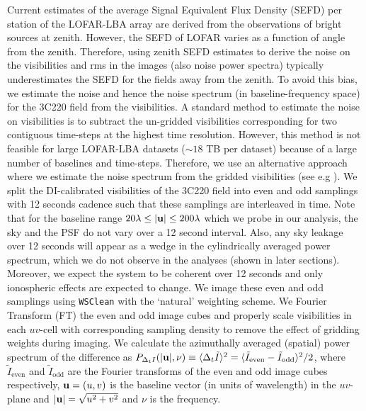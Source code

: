 \documentclass[fleqn,usenatbib]{mnras}
\begin{document}
Current estimates of the average Signal Equivalent Flux Density (SEFD) per station of the LOFAR-LBA array are derived from the observations of bright sources at zenith. However, the SEFD of LOFAR varies as a function of angle from the zenith. Therefore, using zenith SEFD estimates to derive the noise on the visibilities and rms in the images (also noise power spectra) typically underestimates the SEFD for the fields away from the zenith. To avoid this bias, we estimate the noise and hence the noise spectrum (in baseline-frequency space) for the 3C220 field from the visibilities. A standard method to estimate the noise on visibilities is to subtract the un-gridded visibilities corresponding for two contiguous time-steps at the highest time resolution. However, this method is not feasible for large LOFAR-LBA datasets ($\sim18$ TB per dataset) because of a large number of baselines and time-steps. Therefore, we use an alternative approach where we estimate the noise spectrum from the gridded visibilities (see e.g \citealt{jacobs2016,beardsley2016,ewall-wice2016}). We split the DI-calibrated visibilities of the 3C220 field into even and odd samplings with 12 seconds cadence such that these samplings are interleaved in time. Note that for the baseline range $20\lambda \leq |{\it \mathbf{u}}|\leq 200\lambda$ which we probe in our analysis, the sky and the PSF do not vary over a 12 second interval. Also, any sky leakage over 12 seconds will appear as a wedge in the cylindrically averaged power spectrum, which we do not observe in the analyses (shown in later sections). Moreover, we expect the system to be coherent over 12 seconds and only  ionospheric effects are expected to change. We image these even and odd samplings using \texttt{WSClean} with the `natural' weighting scheme. We Fourier Transform (FT) the even and odd image cubes and properly scale visibilities in each $uv$-cell with corresponding sampling density to remove the effect of gridding weights during imaging. We calculate the azimuthally averaged (spatial) power spectrum of the difference as $P_{\Delta_t I}(|{\it \mathbf{u}}|,\nu) \equiv \langle \Delta_{t}\tilde{I} \rangle^2 = \langle \tilde{I}_{\text{even}} - \tilde{I}_{\text{odd}} \rangle^2 / 2$, where $\tilde{I}_{\text{even}}$ and $\tilde{I}_{\text{odd}}$ are the Fourier transforms of the even and odd image cubes respectively, ${\it \mathbf{u}} = (u,v)$ is the baseline vector (in units of wavelength) in the $uv$-plane and $|{\it \mathbf{u}}| = \sqrt{u^2 + v^2}$ and $\nu$ is the  frequency. 
\end{document}
